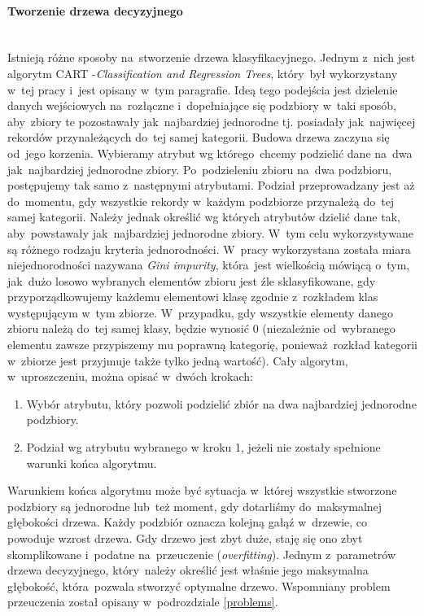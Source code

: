 \paragraph{Tworzenie drzewa decyzyjnego}\mbox{}\\
Istnieją różne sposoby na~stworzenie drzewa klasyfikacyjnego. Jednym z~nich jest algorytm CART -\textit{Classification  and  Regression  Trees}\cite{CART}, który~był wykorzystany w~tej pracy i~jest opisany w~tym paragrafie. Ideą tego podejścia jest dzielenie danych wejściowych na~rozłączne i~dopełniające się podzbiory w~taki sposób, aby~zbiory te pozostawały jak~najbardziej jednorodne tj. posiadały jak~najwięcej rekordów przynależących do~tej samej kategorii. Budowa drzewa zaczyna się od~jego korzenia. Wybieramy atrybut wg którego~chcemy podzielić dane na~dwa jak~najbardziej jednorodne zbiory. Po~podzieleniu zbioru na~dwa podzbioru, postępujemy tak samo z~następnymi atrybutami. Podział przeprowadzany jest aż do~momentu, gdy wszystkie rekordy w~każdym podzbiorze przynależą do~tej samej kategorii. Należy jednak określić wg których atrybutów dzielić dane tak, aby~powstawały jak~najbardziej jednorodne zbiory. W~tym celu wykorzystywane są różnego rodzaju kryteria jednorodności\cite{CART}. W~pracy wykorzystana została miara niejednorodności nazywana \textit{Gini impurity}, która~jest wielkością mówiącą o~tym, jak~dużo losowo wybranych elementów zbioru jest źle sklasyfikowane, gdy przyporządkowujemy każdemu elementowi klasę zgodnie z~rozkładem klas występującym w~tym zbiorze. W~przypadku, gdy wszystkie elementy danego zbioru należą do~tej samej klasy,  będzie wynosić 0 (niezależnie od~wybranego elementu zawsze przypiszemy mu poprawną kategorię, ponieważ~rozkład kategorii w~zbiorze jest przyjmuje także tylko jedną wartość). Cały algorytm, w~uproszczeniu, można opisać w~dwóch krokach:
\begin{enumerate}
\item Wybór atrybutu, który pozwoli podzielić zbiór na dwa najbardziej jednorodne podzbiory.
\item Podział wg atrybutu wybranego w kroku 1, jeżeli nie zostały spełnione warunki końca algorytmu.
\end{enumerate}
Warunkiem końca algorytmu może być sytuacja w~której wszystkie stworzone podzbiory są jednorodne lub~też moment, gdy dotarliśmy do~maksymalnej głębokości drzewa. Każdy podzbiór oznacza kolejną gałąź w~drzewie, co powoduje wzrost drzewa. Gdy drzewo jest zbyt duże, staję się ono zbyt skomplikowane i~podatne na~przeuczenie (\textit{overfitting}). Jednym z~parametrów drzewa decyzyjnego, który~należy określić jest właśnie jego maksymalna głębokość, która~pozwala stworzyć optymalne drzewo. Wspomniany problem przeuczenia został opisany w~podrozdziale \ref{problems}. 


